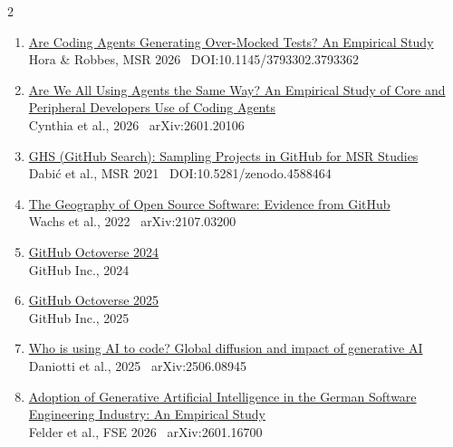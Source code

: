 \documentclass[a4paper,10pt]{article}
\begin{document}
\begin{multicols}{2}
\begin{enumerate}[leftmargin=1.6em, topsep=2pt, itemsep=3.5pt, parsep=0pt]
\item \href{https://doi.org/10.1145/3793302.3793362}%
  {Are Coding Agents Generating Over-Mocked Tests? An Empirical Study}\\
  {\scriptsize Hora \& Robbes, MSR 2026 \textbar\ DOI:10.1145/3793302.3793362}

\item \href{https://arxiv.org/abs/2601.20106}%
  {Are We All Using Agents the Same Way? An Empirical Study of Core and Peripheral Developers Use of Coding Agents}\\
  {\scriptsize Cynthia et al., 2026 \textbar\ arXiv:2601.20106}

\item \href{https://arxiv.org/abs/2103.04682}%
  {GHS (GitHub Search): Sampling Projects in GitHub for MSR Studies}\\
  {\scriptsize Dabi\'c et al., MSR 2021 \textbar\ DOI:10.5281/zenodo.4588464}

\item \href{https://arxiv.org/abs/2107.03200}%
  {The Geography of Open Source Software: Evidence from GitHub}\\
  {\scriptsize Wachs et al., 2022 \textbar\ arXiv:2107.03200}

\item \href{https://github.blog/news-insights/octoverse/octoverse-2024/}%
  {GitHub Octoverse 2024}\\
  {\scriptsize GitHub Inc., 2024}

\item \href{https://github.blog/news-insights/octoverse/octoverse-2025/}%
  {GitHub Octoverse 2025}\\
  {\scriptsize GitHub Inc., 2025}

\item \href{https://arxiv.org/abs/2506.08945}%
  {Who is using AI to code? Global diffusion and impact of generative AI}\\
  {\scriptsize Daniotti et al., 2025 \textbar\ arXiv:2506.08945}

\item \href{https://arxiv.org/abs/2601.16700}%
  {Adoption of Generative Artificial Intelligence in the German Software Engineering Industry: An Empirical Study}\\
  {\scriptsize Felder et al., FSE 2026 \textbar\ arXiv:2601.16700}


\end{enumerate}
\end{multicols}
\end{document}
